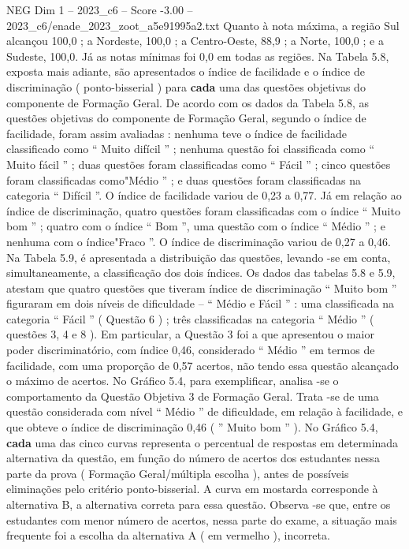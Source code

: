 \begin{textsample}{NEG Dim 1 – 2023\_c6 – Score -3.00 – 2023\_c6/enade\_2023\_zoot\_a5e91995a2.txt}
Quanto à nota máxima, a região Sul alcançou 100,0 ; a Nordeste, 100,0 ; a Centro-Oeste, 88,9 ; a Norte, 100,0 ; e a Sudeste, 100,0.
Já as notas mínimas foi 0,0 em todas as regiões.
Na Tabela 5.8, exposta mais adiante, são apresentados o índice de facilidade e o índice de discriminação ( ponto-bisserial ) para \textbf{cada} uma das questões objetivas do componente de Formação Geral.
De acordo com os dados da Tabela 5.8, as questões objetivas do componente de Formação Geral, segundo o índice de facilidade, foram assim avaliadas : nenhuma teve o índice de facilidade classificado como “ Muito difícil ” ; nenhuma questão foi classificada como “ Muito fácil ” ; duas questões foram classificadas como “ Fácil ” ; cinco questões foram classificadas como"Médio ” ; e duas questões foram classificadas na categoria “ Difícil ”.
O índice de facilidade variou de 0,23 a 0,77.
Já em relação ao índice de discriminação, quatro questões foram classificadas com o índice “ Muito bom ” ; quatro com o índice “ Bom ”, uma questão com o índice “ Médio ” ; e nenhuma com o índice"Fraco ”.
O índice de discriminação variou de 0,27 a 0,46.
Na Tabela 5.9, é apresentada a distribuição das questões, levando -se em conta, simultaneamente, a classificação dos dois índices.
Os dados das tabelas 5.8 e 5.9, atestam que quatro questões que tiveram índice de discriminação “ Muito bom ” figuraram em dois níveis de dificuldade – “ Médio e Fácil ” : uma classificada na categoria “ Fácil ” ( Questão 6 ) ; três classificadas na categoria “ Médio ” ( questões 3, 4 e 8 ).
Em particular, a Questão 3 foi a que apresentou o maior poder discriminatório, com índice 0,46, considerado “ Médio ” em termos de facilidade, com uma proporção de 0,57 acertos, não tendo essa questão alcançado o máximo de acertos.
No Gráfico 5.4, para exemplificar, analisa -se o comportamento da Questão Objetiva 3 de Formação Geral.
Trata -se de uma questão considerada com nível “ Médio ” de dificuldade, em relação à facilidade, e que obteve o índice de discriminação 0,46 ( ” Muito bom ” ).
No Gráfico 5.4, \textbf{cada} uma das cinco curvas representa o percentual de respostas em determinada alternativa da questão, em função do número de acertos dos estudantes nessa parte da prova ( Formação Geral/múltipla escolha ), antes de possíveis eliminações pelo critério ponto-bisserial.
A curva em mostarda corresponde à alternativa B, a alternativa correta para essa questão.
Observa -se que, entre os estudantes com menor número de acertos, nessa parte do exame, a situação mais frequente foi a escolha da alternativa A ( em vermelho ), incorreta.

\end{textsample}
